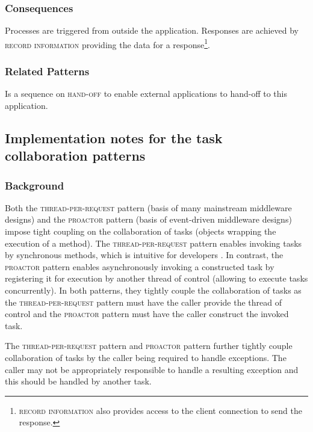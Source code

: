\documentclass[prodmode]{style/acmlarge}
\begin{document}
\subsubsection*{Consequences} Processes are triggered from outside the
application. Responses are achieved by \textsc{record information} providing the
data for a response\footnote{\textsc{record information} also provides
access to the client connection to send the response.}.

\subsubsection*{Related Patterns} Is a sequence on \textsc{hand-off} to enable
external applications to hand-off to this application.



\subsection{Implementation notes for the task collaboration patterns}

\subsubsection*{Background}

Both the \textsc{thread-per-request} pattern \cite{thread-per-request} (basis of
many mainstream middleware designs) and the \textsc{proactor} pattern
\cite{proactor} (basis of event-driven middleware designs) impose tight
coupling on the collaboration of tasks (objects wrapping the execution of a
method).  The \textsc{thread-per-request} pattern enables invoking tasks by
synchronous methods, which is intuitive for developers \cite{proactor}.
In contrast, the \textsc{proactor} pattern enables asynchronously invoking a
constructed task by registering it for execution by another thread of control
(allowing to execute tasks concurrently).  In both patterns, they tightly couple
the collaboration of tasks as the \textsc{thread-per-request} pattern must have
the caller provide the thread of control and the \textsc{proactor} pattern must
have the caller construct the invoked task.

The \textsc{thread-per-request} pattern and \textsc{proactor} pattern further
tightly couple collaboration of tasks by the caller being required to handle
exceptions.  The caller may not be appropriately responsible to handle a
resulting exception and this should be handled by another task.
\end{document}
